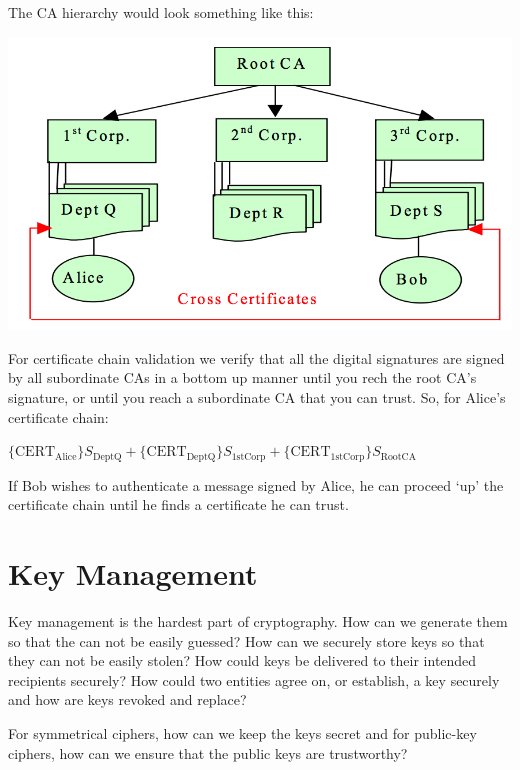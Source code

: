 \documentclass{article}
\begin{document}
The CA hierarchy would look something like this:
\begin{center}
  \includegraphics[scale=0.]{CA-hierarchy.png}
\end{center}
For certificate chain validation we verify that all the digital signatures are signed by all subordinate CAs in a bottom up manner until you rech the root CA's signature, or until you reach a subordinate CA that you can trust. So, for Alice's certificate chain:
\begin{center}
  $\{\text{CERT}_{\text{Alice}}\}S_{\text{DeptQ}} + \{\text{CERT}_{\text{DeptQ}}\}S_{\text{1stCorp}} + \{\text{CERT}_{\text{1stCorp}}\}S_{\text{RootCA}}$
\end{center}
If Bob wishes to authenticate a message signed by Alice, he can proceed `up' the certificate chain until he finds a certificate he can trust.

\section{Key Management}
Key management is the hardest part of cryptography. How can we generate them so that the can not be easily guessed? How can we securely store keys so that they can not be easily stolen? How could keys be delivered to their intended recipients securely? How could two entities agree on, or establish, a key securely and how are keys revoked and replace?

For symmetrical ciphers, how can we keep the keys secret and for public-key ciphers, how can we ensure that the public keys are trustworthy?
\end{document}
